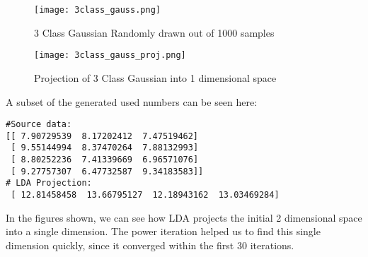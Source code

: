 \begin{figure}
\centering
\texttt{[image: 3class\_gauss.png]}
\caption{3 Class Gaussian Randomly drawn out of 1000 samples}

\texttt{[image: 3class\_gauss\_proj.png]}
\centering
\caption{Projection of 3 Class Gaussian into 1 dimensional space}
\end{figure}

A subset of the generated used numbers can be seen here:
\begin{verbatim}
#Source data:
[[ 7.90729539  8.17202412  7.47519462]
 [ 9.55144994  8.37470264  7.88132993]
 [ 8.80252236  7.41339669  6.96571076]
 [ 9.27757307  6.47732587  9.34183583]]
# LDA Projection:
 [ 12.81458458  13.66795127  12.18943162  13.03469284]
\end{verbatim}

In the figures shown, we can see how LDA projects the initial 2 dimensional space into a single dimension. The power iteration helped us to find this single dimension quickly, since it converged within the first 30 iterations.
